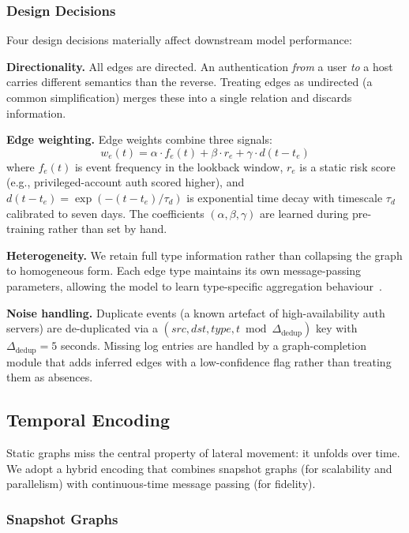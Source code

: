 \documentclass[sigconf,nonacm]{acmart}
\begin{document}
\subsubsection{Design Decisions}

Four design decisions materially affect downstream model performance:

\textbf{Directionality.} All edges are directed. An authentication
\textit{from} a user \textit{to} a host carries different semantics than the
reverse. Treating edges as undirected (a common simplification) merges these
into a single relation and discards information.

\textbf{Edge weighting.} Edge weights combine three signals:
\begin{equation}
  w_e(t) = \alpha \cdot f_e(t) + \beta \cdot r_e + \gamma \cdot d(t - t_e)
\end{equation}
where $f_e(t)$ is event frequency in the lookback window, $r_e$ is a static
risk score (e.g., privileged-account auth scored higher), and $d(t-t_e) =
\exp(-(t-t_e)/\tau_d)$ is exponential time decay with timescale $\tau_d$
calibrated to seven days. The coefficients $(\alpha, \beta, \gamma)$ are
learned during pre-training rather than set by hand.

\textbf{Heterogeneity.} We retain full type information rather than
collapsing the graph to homogeneous form. Each edge type maintains its own
message-passing parameters, allowing the model to learn type-specific
aggregation behaviour~\cite{schlichtkrull2018rgcn}.

\textbf{Noise handling.} Duplicate events (a known artefact of
high-availability auth servers) are de-duplicated via a $(src, dst, type, t \bmod
\Delta_\text{dedup})$ key with $\Delta_\text{dedup} = 5$ seconds. Missing
log entries are handled by a graph-completion module that adds inferred
edges with a low-confidence flag rather than treating them as absences.

\subsection{Temporal Encoding}

Static graphs miss the central property of lateral movement: it unfolds over
time. We adopt a hybrid encoding that combines snapshot graphs (for
scalability and parallelism) with continuous-time message passing (for
fidelity).

\subsubsection{Snapshot Graphs}
\end{document}
